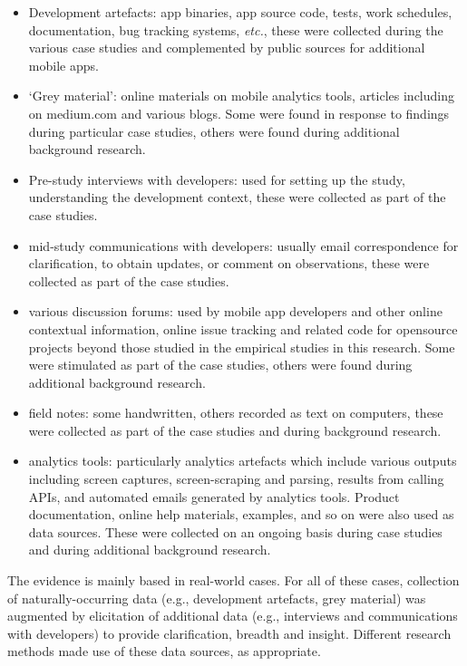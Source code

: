 \begin{itemize}
    \itemsep0em
    \item Development artefacts: app binaries, app source code, tests, work schedules, documentation, bug tracking systems, \textit{etc.}, these were collected during the various case studies and complemented by public sources for additional mobile apps.
    \item `Grey material': online materials on mobile analytics tools, articles including on medium.com and various blogs. Some were found in response to findings during particular case studies, others were found during additional background research.
    \item Pre-study interviews with developers: used for setting up the study, understanding the development context, these were collected as part of the case studies.
    \item mid-study communications with developers: usually email correspondence for clarification, to obtain updates, or comment on observations, these were collected as part of the case studies.
    \item various discussion forums: used by mobile app developers and other online contextual information, online issue tracking and related code for opensource projects beyond those studied in the empirical studies in this research. Some were stimulated as part of the case studies, others were found during additional background research.
    \item field notes: some handwritten, others recorded as text on computers, these were collected as part of the case studies and during background research.
    \item analytics tools: particularly analytics artefacts which include various outputs including screen captures, screen-scraping and parsing, results from calling APIs, and automated emails generated by analytics tools. Product documentation, online help materials, examples, and so on were also used as data sources. These were collected on an ongoing basis during case studies and during additional background research.
\end{itemize}

The evidence is mainly based in real-world cases. For all of these cases, collection of naturally-occurring data (e.g., development artefacts, grey material) was augmented by elicitation of additional data (e.g., interviews and communications with developers) to provide clarification, breadth and insight.  Different research methods made use of these data sources, as appropriate.

